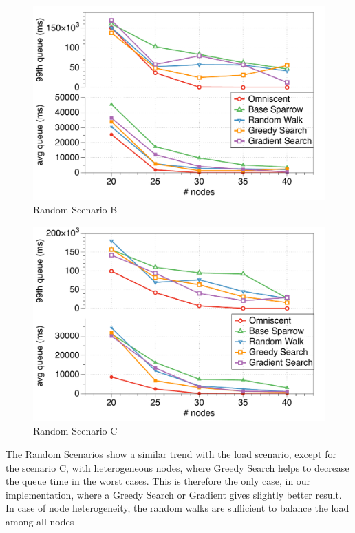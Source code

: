 \documentclass[conference]{IEEEtran}
\begin{document}
\begin{figure}
\begin{center}
\includegraphics[scale=0.45]{figures/randomB}
\caption{Random Scenario B}
\label{fig:comparison}
\end{center}
\end{figure}

\begin{figure}
\begin{center}
\includegraphics[scale=0.45]{figures/randomC}
\caption{Random Scenario C}
\label{fig:comparison}
\end{center}
\end{figure}

The Random Scenarios show a similar trend with the load scenario, except for the scenario C, with heterogeneous nodes, where Greedy Search helps to decrease the queue time in the worst cases.
This is therefore the only case, in our implementation, where a Greedy Search or Gradient gives slightly better result. In case of node heterogeneity, the random walks are sufficient to balance the load among all nodes
\end{document}
